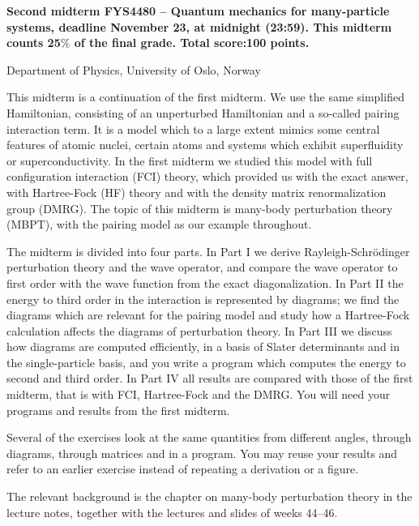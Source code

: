 \documentclass[prc]{revtex4}
\begin{document}
\begin{center}
{\LARGE\bf
Second midterm FYS4480 – Quantum mechanics for many-particle systems, deadline November 23, at midnight (23:59). This midterm counts 25$\%$ of the final grade. Total score:100 points.}
\end{center}
\begin{center}
\centerline{{\small Department of Physics, University of Oslo, Norway}}
\end{center}


This midterm is a continuation of the first midterm. We use the same
simplified Hamiltonian, consisting of an unperturbed Hamiltonian and a
so-called pairing interaction term. It is a model which to a large
extent mimics some central features of atomic nuclei, certain atoms
and systems which exhibit superfluidity or superconductivity. In the
first midterm we studied this model with full configuration
interaction (FCI) theory, which provided us with the exact answer,
with Hartree-Fock (HF) theory and with the density matrix
renormalization group (DMRG). The topic of this midterm is many-body
perturbation theory (MBPT), with the pairing model as our example
throughout.

The midterm is divided into four parts. In Part I we derive
Rayleigh-Schr\"odinger perturbation theory and the wave operator, and
compare the wave operator to first order with the wave function from
the exact diagonalization. In Part II the energy to third order in
the interaction is represented by diagrams; we find the diagrams which
are relevant for the pairing model and study how a Hartree-Fock
calculation affects the diagrams of perturbation theory. In Part III
we discuss how diagrams are computed efficiently, in a basis of Slater
determinants and in the single-particle basis, and you write a program
which computes the energy to second and third order. In Part IV all
results are compared with those of the first midterm, that is with
FCI, Hartree-Fock and the DMRG. You will need your programs and
results from the first midterm.

Several of the exercises look at the same quantities from different
angles, through diagrams, through matrices and in a program. You may
reuse your results and refer to an earlier exercise instead of
repeating a derivation or a figure.

The relevant background is the chapter on many-body perturbation
theory in the lecture notes, together with the lectures and slides of
weeks 44--46.
\end{document}
